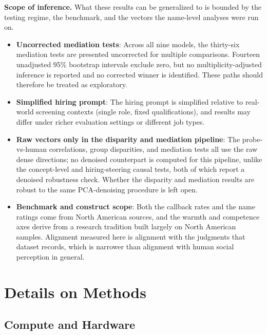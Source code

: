 \documentclass[twocolumn]{article}
\begin{document}
\begin{appendices}
\smallskip\noindent\textbf{Scope of inference.}
What these results can be generalized to is bounded by the testing regime,
the benchmark, and the vectors the name-level analyses were run on.

\begin{itemize}[leftmargin=*, itemsep=2pt, topsep=4pt, parsep=0pt]
  \item \textbf{Uncorrected mediation tests}: Across all nine models, the
  thirty-six mediation tests are presented uncorrected for multiple
  comparisons. Fourteen unadjusted 95\% bootstrap intervals exclude zero,
  but no multiplicity-adjusted inference is reported and no corrected winner
  is identified. These paths should therefore be treated as exploratory.
  \item \textbf{Simplified hiring prompt}: The hiring prompt is simplified
  relative to real-world screening contexts (single role, fixed
  qualifications), and results may differ under richer evaluation
  settings or different job types.
  \item \textbf{Raw vectors only in the disparity and mediation pipeline}:
  The probe-vs-human correlations, group disparities, and mediation tests
  all use the raw dense directions; no denoised counterpart is computed
  for this pipeline, unlike the concept-level and hiring-steering causal
  tests, both of which report a denoised robustness check. Whether the
  disparity and mediation results are robust to the same PCA-denoising
  procedure is left open.
  \item \textbf{Benchmark and construct scope}: Both the callback rates and
  the name ratings come from North American sources, and the warmth and
  competence axes derive from a research tradition built largely on North
  American samples. Alignment measured here is alignment with the judgments
  that dataset records, which is narrower than alignment with human social
  perception in general.
\end{itemize}


\section*{Details on Methods}
\label{apx:methods}

\subsection*{Compute and Hardware}


\end{appendices}
\end{document}
